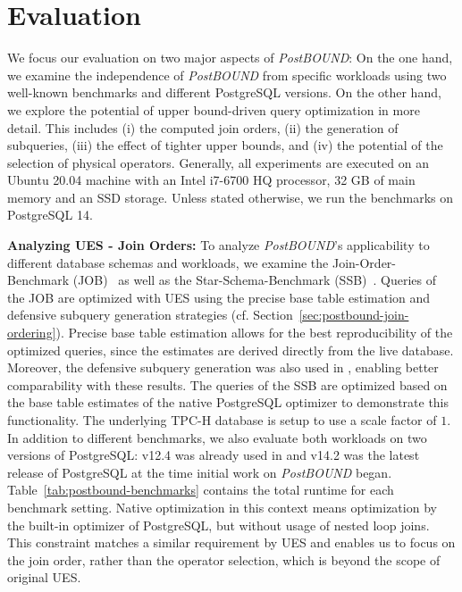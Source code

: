\section{Evaluation}
\label{sec:Eval}

We focus our evaluation on two major aspects of \emph{PostBOUND}: On the one hand, we examine the independence of \emph{PostBOUND} from specific workloads using two well-known benchmarks and different PostgreSQL versions.
On the other hand, we explore the potential of upper bound-driven query optimization in more detail.
This includes (i) the computed join orders, (ii) the generation of subqueries, (iii) the effect of tighter upper bounds, and (iv) the potential of the selection of physical operators.
Generally, all experiments are executed on an Ubuntu 20.04 machine with an Intel i7-6700 HQ processor, 32 GB of main memory and an SSD storage.
Unless stated otherwise, we run the benchmarks on PostgreSQL 14.



\textbf{Analyzing UES - Join Orders:}
To analyze \emph{PostBOUND}'s applicability to different database schemas and workloads, we examine the Join-Order-Benchmark (JOB)~\cite{DBLP:journals/pvldb/LeisGMBK015} as well as the Star-Schema-Benchmark (SSB)~\cite{DBLP:journals/corr/Sanchez16a}.
Queries of the JOB are optimized with UES using the precise base table estimation and defensive subquery generation strategies (cf. Section~\ref{sec:postbound-join-ordering}).
Precise base table estimation allows for the best reproducibility of the optimized queries, since the estimates are derived directly from the live database.
Moreover, the defensive subquery generation was also used in \cite{hertzschuch-21-ues}, enabling better comparability with these results.
The queries of the SSB are optimized based on the base table estimates of the native PostgreSQL optimizer to demonstrate this functionality.
The underlying TPC-H database is setup to use a scale factor of $1$.
In addition to different benchmarks, we also evaluate both workloads on two versions of PostgreSQL: v12.4 was already used in \cite{hertzschuch-21-ues} and v14.2 was the latest release of PostgreSQL at the time initial work on \emph{PostBOUND} began. Table~\ref{tab:postbound-benchmarks} contains the total runtime for each benchmark setting.
Native optimization in this context means optimization by the built-in optimizer of PostgreSQL, but without usage of nested loop joins.
This constraint matches a similar requirement by UES and enables us to focus on the join order, rather than the operator selection, which is beyond the scope of original UES.

